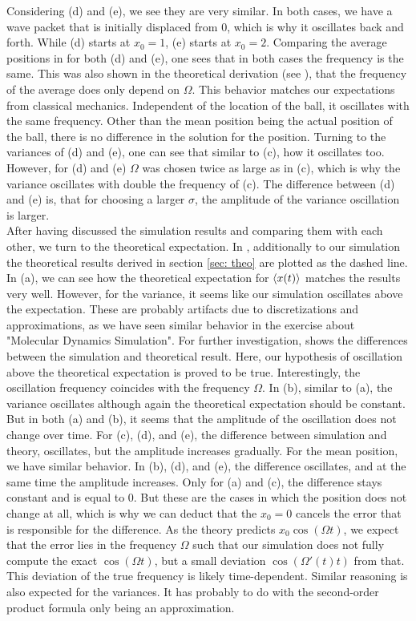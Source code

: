 Considering (d) and (e), we see they are very similar. In both cases, we have a wave packet that is initially displaced from 0, which is why it oscillates back and forth. While (d) starts at $x_0 = 1$, (e) starts at $x_0 = 2$. Comparing the average positions in  for both (d) and (e), one sees that in both cases the frequency is the same. This was also shown in the theoretical derivation (see ), that the frequency of the average does only depend on $\Omega$. This behavior matches our expectations from classical mechanics. Independent of the location of the ball, it oscillates with the same frequency. Other than the mean position being the actual position of the ball, there is no difference in the solution for the position. Turning to the variances of (d) and (e), one can see that similar to (c), how it oscillates too. However, for (d) and (e) $\Omega$ was chosen twice as large as in (c), which is why the variance oscillates with double the frequency of (c). The difference between (d) and (e) is, that for choosing a larger $\sigma$, the amplitude of the variance oscillation is larger.\\

After having discussed the simulation results and comparing them with each other, we turn to the theoretical expectation. In , additionally to our simulation the theoretical results derived in section \ref{sec: theo} are plotted as the dashed line. In (a), we can see how the theoretical expectation for $\braket{x(t)}$ matches the results very well. However, for the variance, it seems like our simulation oscillates above the expectation. These are probably artifacts due to discretizations and approximations, as we have seen similar behavior in the exercise about "Molecular Dynamics Simulation". For further investigation,  shows the differences between the simulation and theoretical result. Here, our hypothesis of oscillation above the theoretical expectation is proved to be true. Interestingly, the oscillation frequency coincides with the frequency $\Omega$. In (b), similar to (a), the variance oscillates although again the theoretical expectation should be constant. But in both (a) and (b), it seems that the amplitude of the oscillation does not change over time. For (c), (d), and (e), the difference between simulation and theory, oscillates, but the amplitude increases gradually. For the mean position, we have similar behavior. In (b), (d), and (e), the difference oscillates, and at the same time the amplitude increases. Only for (a) and (c), the difference stays constant and is equal to 0. But these are the cases in which the position does not change at all, which is why we can deduct that the $x_0 = 0$ cancels the error that is responsible for the difference. As the theory predicts $x_0 \cos(\Omega t)$, we expect that the error lies in the frequency $\Omega$ such that our simulation does not fully compute the exact $\cos (\Omega t)$, but a small deviation $\cos (\Omega '(t) t)$ from that. This deviation of the true frequency is likely time-dependent. Similar reasoning is also expected for the variances. It has probably to do with the second-order product formula only being an approximation.\\

